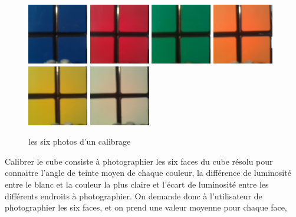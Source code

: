 \documentclass[11pt,a4paper]{article}
\begin{document}
\begin{figure}[h]
	\centering
	\includegraphics[scale=0.4]{calibrage0}
	\includegraphics[scale=0.4]{calibrage1}
	\includegraphics[scale=0.4]{calibrage2}
	\includegraphics[scale=0.4]{calibrage3}
	\includegraphics[scale=0.4]{calibrage4}
	\includegraphics[scale=0.4]{calibrage5}
	\caption{les six photos d'un calibrage}
\end{figure}
    Calibrer le cube consiste à photographier les six faces du cube résolu pour connaitre l'angle de teinte moyen de chaque
couleur, la différence de luminosité entre le blanc et la couleur la plus claire et l'écart de luminosité entre les différents
endroits à photographier.
    On demande donc à l'utilisateur de photographier les six faces, et on prend une valeur moyenne pour chaque face,
\end{document}
